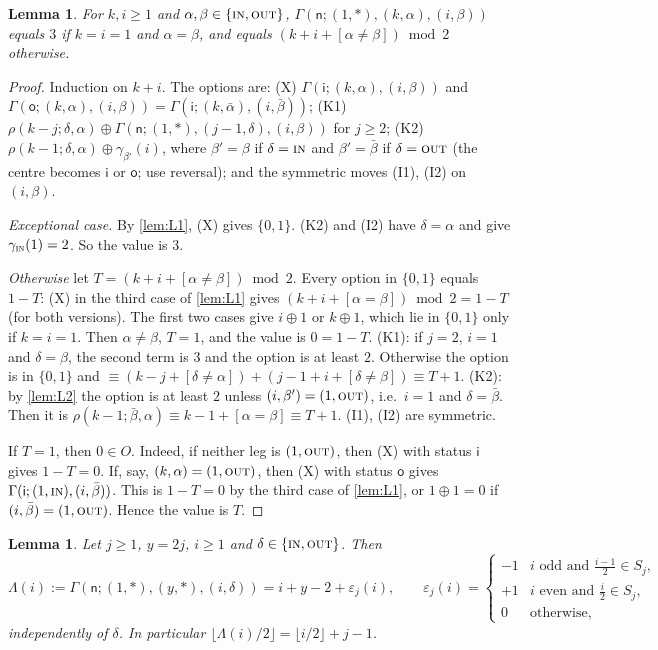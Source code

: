 \documentclass[11pt]{amsart}
\newtheorem{lemma}[theorem]{Lemma}
\theoremstyle{definition}
\theoremstyle{remark}
\newcommand{\sn}{\mathsf{n}}
\newcommand{\si}{\mathsf{i}}
\newcommand{\so}{\mathsf{o}}
\newcommand{\free}{\ast}
\newcommand{\IN}{\textup{\textsc{in}}}
\newcommand{\OUT}{\textup{\textsc{out}}}
\begin{document}
\begin{lemma}\label{lem:L4}
For $k,i\ge1$ and $\alpha,\beta\in\{\IN,\OUT\}$, $\Gamma(\sn;(1,\free),(k,\alpha),(i,\beta))$ equals $3$ if $k=i=1$ and $\alpha=\beta$, and equals $(k+i+[\alpha\neq\beta])\bmod 2$ otherwise.
\end{lemma}

\begin{proof}
Induction on $k+i$. The options are:
(X) $\Gamma(\si;(k,\alpha),(i,\beta))$ and $\Gamma(\so;(k,\alpha),(i,\beta))=\Gamma(\si;(k,\bar\alpha),(i,\bar\beta))$;
(K1) $\rho(k-j;\delta,\alpha)\oplus\Gamma(\sn;(1,\free),(j-1,\delta),(i,\beta))$ for $j\ge2$;
(K2) $\rho(k-1;\delta,\alpha)\oplus\gamma_{\beta'}(i)$, where $\beta'=\beta$ if $\delta=\IN$ and $\beta'=\bar\beta$ if $\delta=\OUT$ (the centre becomes $\si$ or $\so$; use reversal);
and the symmetric moves (I1), (I2) on $(i,\beta)$.

\emph{Exceptional case.} By \cref{lem:L1}, (X) gives $\{0,1\}$. (K2) and (I2) have $\delta=\alpha$ and give $\gamma_\IN(1)=2$. So the value is $3$.

\emph{Otherwise} let $T=(k+i+[\alpha\neq\beta])\bmod2$. Every option in $\{0,1\}$ equals $1-T$:
(X) in the third case of \cref{lem:L1} gives $(k+i+[\alpha=\beta])\bmod 2=1-T$ (for both versions). The first two cases give $i\oplus1$ or $k\oplus1$, which lie in $\{0,1\}$ only if $k=i=1$. Then $\alpha\ne\beta$, $T=1$, and the value is $0=1-T$.
(K1): if $j=2$, $i=1$ and $\delta=\beta$, the second term is $3$ and the option is at least $2$. Otherwise the option is in $\{0,1\}$ and $\equiv (k-j+[\delta\ne\alpha])+(j-1+i+[\delta\ne\beta])\equiv T+1$.
(K2): by \cref{lem:L2} the option is at least $2$ unless $(i,\beta')=(1,\OUT)$, i.e.\ $i=1$ and $\delta=\bar\beta$. Then it is $\rho(k-1;\bar\beta,\alpha)\equiv k-1+[\alpha=\beta]\equiv T+1$.
(I1), (I2) are symmetric.

If $T=1$, then $0\in O$. Indeed, if neither leg is $(1,\OUT)$, then (X) with status $\si$ gives $1-T=0$. If, say, $(k,\alpha)=(1,\OUT)$, then (X) with status $\so$ gives $\Gamma(\si;(1,\IN),(i,\bar\beta))$. This is $1-T=0$ by the third case of \cref{lem:L1}, or $1\oplus1=0$ if $(i,\bar\beta)=(1,\OUT)$. Hence the value is $T$.
\end{proof}

\begin{lemma}\label{lem:L5}
Let $j\ge1$, $y=2j$, $i\ge1$ and $\delta\in\{\IN,\OUT\}$. Then
\[
  \Lambda(i):=\Gamma(\sn;(1,\free),(y,\free),(i,\delta))=i+y-2+\varepsilon_j(i),
  \qquad
  \varepsilon_j(i)=\begin{cases}-1& i \text{ odd and } \frac{i-1}2\in S_j,\\ +1 & i\text{ even and } \frac i2\in S_j,\\ 0&\text{otherwise,}\end{cases}
\]
independently of $\delta$. In particular $\lfloor \Lambda(i)/2\rfloor=\lfloor i/2\rfloor+j-1$.
\end{lemma}
\end{document}
